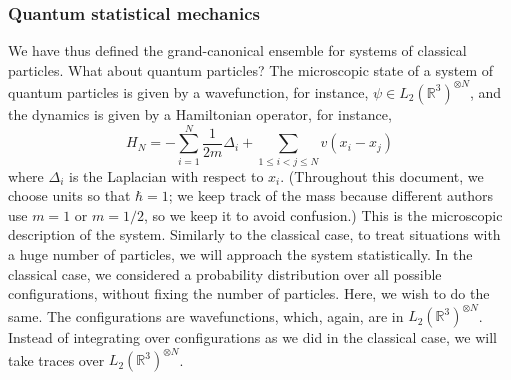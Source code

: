 \documentclass{ian}
\begin{document}
\subsubsection{Quantum statistical mechanics}
\indent
We have thus defined the grand-canonical ensemble for systems of classical particles.
What about quantum particles?
The microscopic state of a system of quantum particles is given by a wavefunction, for instance, $\psi\in L_2(\mathbb R^3)^{\otimes N}$, and the dynamics is given by a Hamiltonian operator, for instance,
\begin{equation}
  H_N=-\sum_{i=1}^N\frac1{2m}\Delta_{i}+\sum_{1\leqslant i<j\leqslant N}v(x_i-x_j)
  \label{H}
\end{equation}
where $\Delta_i$ is the Laplacian with respect to $x_i$.
(Throughout this document, we choose units so that $\hbar=1$; we keep track of the mass because different authors use $m=1$ or $m=1/2$, so we keep it to avoid confusion.)
This is the microscopic description of the system.
Similarly to the classical case, to treat situations with a huge number of particles, we will approach the system statistically.
In the classical case, we considered a probability distribution over all possible configurations, without fixing the number of particles.
Here, we wish to do the same.
The configurations are wavefunctions, which, again, are in $L_2(\mathbb R^3)^{\otimes N}$.
Instead of integrating over configurations as we did in the classical case, we will take traces over $L_2(\mathbb R^3)^{\otimes N}$.
\bigskip
\end{document}
